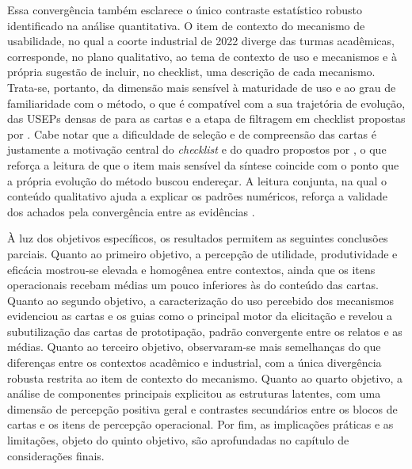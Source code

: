 Essa convergência também esclarece o único contraste estatístico robusto identificado na análise quantitativa. O item de contexto do mecanismo de usabilidade, no qual a coorte industrial de 2022 diverge das turmas acadêmicas, corresponde, no plano qualitativo, ao tema de contexto de uso e mecanismos e à própria sugestão de incluir, no checklist, uma descrição de cada mecanismo. Trata-se, portanto, da dimensão mais sensível à maturidade de uso e ao grau de familiaridade com o método, o que é compatível com a sua trajetória de evolução, das USEPs densas de  para as cartas e a etapa de filtragem em checklist propostas por . Cabe notar que a dificuldade de seleção e de compreensão das cartas é justamente a motivação central do \textit{checklist} e do quadro propostos por , o que reforça a leitura de que o item mais sensível da síntese coincide com o ponto que a própria evolução do método buscou endereçar. A leitura conjunta, na qual o conteúdo qualitativo ajuda a explicar os padrões numéricos, reforça a validade dos achados pela convergência entre as evidências \cite{braunclarke2006}.

À luz dos objetivos específicos, os resultados permitem as seguintes conclusões parciais. Quanto ao primeiro objetivo, a percepção de utilidade, produtividade e eficácia mostrou-se elevada e homogênea entre contextos, ainda que os itens operacionais recebam médias um pouco inferiores às do conteúdo das cartas. Quanto ao segundo objetivo, a caracterização do uso percebido dos mecanismos evidenciou as cartas e os guias como o principal motor da elicitação e revelou a subutilização das cartas de prototipação, padrão convergente entre os relatos e as médias. Quanto ao terceiro objetivo, observaram-se mais semelhanças do que diferenças entre os contextos acadêmico e industrial, com a única divergência robusta restrita ao item de contexto do mecanismo. Quanto ao quarto objetivo, a análise de componentes principais explicitou as estruturas latentes, com uma dimensão de percepção positiva geral e contrastes secundários entre os blocos de cartas e os itens de percepção operacional. Por fim, as implicações práticas e as limitações, objeto do quinto objetivo, são aprofundadas no capítulo de considerações finais.